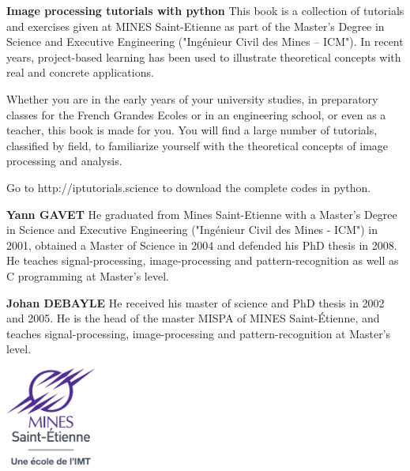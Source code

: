 \textbf{Image processing tutorials with python}
This book is a collection of tutorials and exercises given at MINES Saint-Etienne as part of the Master’s Degree in Science and Executive Engineering ("Ingénieur Civil des Mines -- ICM"). In recent years, project-based learning has been used to illustrate theoretical concepts with real and concrete applications.

Whether you are in the early years of your university studies, in preparatory classes for the French Grandes Ecoles or in an engineering school, or even as a teacher, this book is made for you. You will find a large number of tutorials, classified by field, to familiarize yourself with the theoretical concepts of image processing and analysis. 

Go to http://iptutorials.science to download the complete codes in python.

\textbf{Yann GAVET} He graduated from Mines Saint-Etienne with a Master’s Degree in Science and Executive Engineering ("Ingénieur Civil des Mines - ICM") in 2001, obtained a Master of Science in 2004 and defended his PhD thesis in 2008. He teaches signal-processing, image-processing and pattern-recognition as well as C programming at Master’s level.

\textbf{Johan DEBAYLE} He received his master of science and PhD thesis in 2002 and 2005. He is the head of the master MISPA of MINES Saint-\'Etienne, and teaches signal-processing, image-processing and pattern-recognition at Master's level.

\begin{center}
 \includegraphics[width=3cm]{emse.pdf}
\end{center}
